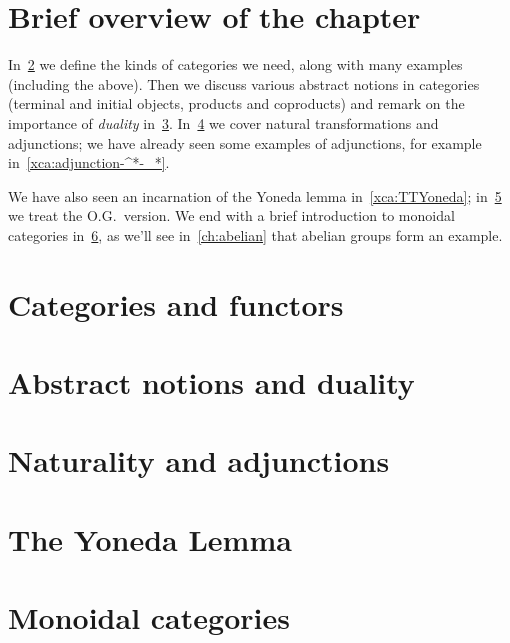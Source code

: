 \section{Brief overview of the chapter}

In~\cref{sec:categories} we define the kinds of categories we need, along with many examples (including the above).
Then we discuss various abstract notions in categories (terminal and initial objects, products and coproducts)
and remark on the importance of \emph{duality} in~\cref{sec:duality}.
In~\cref{sec:naturality} we cover natural transformations and adjunctions; we have already seen some examples of adjunctions, for example in~\cref{xca:adjunction-^*-_*}.

We have also seen an incarnation of the Yoneda lemma in~\cref{xca:TTYoneda}; in~\cref{sec:yoneda} we treat the O.G.\ version. We end with a brief introduction to monoidal categories in~\cref{sec:monoidal-cats}, as we'll see in~\cref{ch:abelian} that abelian groups form an example.

\section{Categories and functors}
\label{sec:categories}


\section{Abstract notions and duality}
\label{sec:duality}


\section{Naturality and adjunctions}
\label{sec:naturality}


\section{The Yoneda Lemma}
\label{sec:yoneda}


\section{Monoidal categories}
\label{sec:monoidal-cats}



